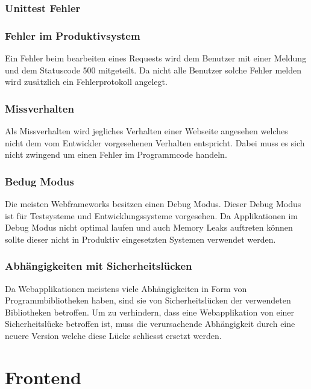 \subsubsection{Unittest Fehler}
\label{ssub:unittest_fehler}

\subsubsection{Fehler im Produktivsystem}
\label{ssub:fehler_im_produktivsystem}
Ein Fehler beim bearbeiten eines Requests wird dem Benutzer mit einer Meldung und dem Statuscode 500 mitgeteilt. Da nicht alle Benutzer solche Fehler melden wird zusätzlich ein Fehlerprotokoll angelegt.

\subsubsection{Missverhalten}
\label{ssub:missverhalten}
Als Missverhalten wird jegliches Verhalten einer Webseite angesehen welches nicht dem vom Entwickler vorgesehenen Verhalten entspricht. Dabei muss es sich nicht zwingend um einen Fehler im Programmcode handeln.

\subsubsection{Bedug Modus}
\label{ssub:bedug_modus}
Die meisten Webframeworks besitzen einen Debug Modus. Dieser Debug Modus ist für Testsysteme und Entwicklungssysteme vorgesehen. Da Applikationen im Debug Modus nicht optimal laufen und auch Memory Leaks auftreten können sollte dieser nicht in Produktiv eingesetzten Systemen verwendet werden.

\subsubsection{Abhängigkeiten mit Sicherheitslücken}
\label{ssub:abhängigkeiten_mit_sicherheitslücken}
Da Webapplikationen meistens viele Abhängigkeiten in Form von Programmbibliotheken haben, sind sie von Sicherheitslücken der verwendeten Bibliotheken betroffen. Um zu verhindern, dass eine Webapplikation von einer Sicherheitslücke betroffen ist, muss die verursachende Abhängigkeit durch eine neuere Version welche diese Lücke schliesst ersetzt werden.


\section{Frontend}
\label{sec:frontend}

